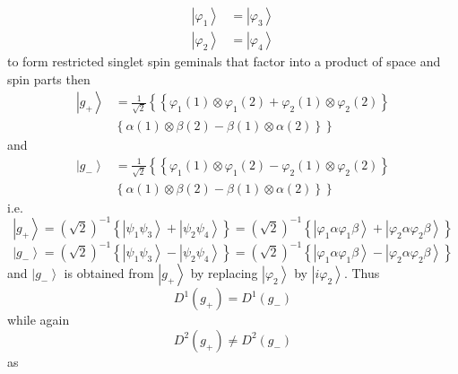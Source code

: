 \documentclass[aps,preprint]{revtex4}%
\begin{document}
\begin{align}
\left\vert \varphi_{1}\right\rangle  &  =\left\vert \varphi_{3}\right\rangle
\nonumber\\
\left\vert \varphi_{2}\right\rangle  &  =\left\vert \varphi_{4}\right\rangle
\end{align}
to form restricted singlet spin geminals that factor into a product of space
and spin parts then
\begin{align}
\left\vert g_{+}\right\rangle  &  =\frac{1}{\sqrt{2}}\left\{  \overset{}%
{}\left\{  \varphi_{1}\left(  1\right)  \otimes\varphi_{1}\left(  2\right)
+\varphi_{2}\left(  1\right)  \otimes\varphi_{2}\left(  2\right)  \right\}
\right. \nonumber\\
&  \left.  \left\{  \alpha\left(  1\right)  \otimes\beta\left(  2\right)
-\beta\left(  1\right)  \otimes\alpha\left(  2\right)  \right\}  \overset{}%
{}\right\}
\end{align}
and
\begin{align}
\left\vert g_{-}\right\rangle  &  =\frac{1}{\sqrt{2}}\left\{  \overset{}%
{}\left\{  \varphi_{1}\left(  1\right)  \otimes\varphi_{1}\left(  2\right)
-\varphi_{2}\left(  1\right)  \otimes\varphi_{2}\left(  2\right)  \right\}
\right. \nonumber\\
&  \left.  \left\{  \alpha\left(  1\right)  \otimes\beta\left(  2\right)
-\beta\left(  1\right)  \otimes\alpha\left(  2\right)  \right\}  \overset{}%
{}\right\}
\end{align}
i.e.
\[
\left\vert g_{+}\right\rangle =\left(  \sqrt{2}\right)  ^{-1}\left\{
\left\vert \psi_{1}\psi_{3}\right\rangle +\left\vert \psi_{2}\psi
_{4}\right\rangle \right\}  =\left(  \sqrt{2}\right)  ^{-1}\left\{  \left\vert
\varphi_{1}\alpha\varphi_{1}\beta\right\rangle +\left\vert \varphi_{2}%
\alpha\varphi_{2}\beta\right\rangle \right\}
\]%
\[
\left\vert g_{-}\right\rangle =\left(  \sqrt{2}\right)  ^{-1}\left\{
\left\vert \psi_{1}\psi_{3}\right\rangle -\left\vert \psi_{2}\psi
_{4}\right\rangle \right\}  =\left(  \sqrt{2}\right)  ^{-1}\left\{  \left\vert
\varphi_{1}\alpha\varphi_{1}\beta\right\rangle -\left\vert \varphi_{2}%
\alpha\varphi_{2}\beta\right\rangle \right\}
\]
and $\left\vert g_{-}\right\rangle $ is obtained from $\left\vert
g_{+}\right\rangle $ by replacing $\left\vert \varphi_{2}\right\rangle $ by
$\left\vert i\varphi_{2}\right\rangle $. Thus
\[
D^{1}\left(  g_{+}\right)  =D^{1}\left(  g_{-}\right)
\]
while again
\[
D^{2}\left(  g_{+}\right)  \neq D^{2}\left(  g_{-}\right)
\]
as
\end{document}

